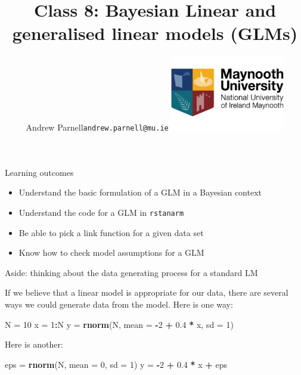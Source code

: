 \documentclass[ignorenonframetext,]{beamer}
\title{Class 8: Bayesian Linear and generalised linear models (GLMs)}
\author{Andrew Parnell\newline \texttt{andrew.parnell@mu.ie}
\newline \vspace{1cm} \newline \includegraphics[width=5cm]{MU_logo.jpg}}
\date{}
\newenvironment{Shaded}{\begin{snugshade}}{\end{snugshade}}
\newcommand{\KeywordTok}[1]{\textcolor[rgb]{0.13,0.29,0.53}{\textbf{#1}}}
\newcommand{\DataTypeTok}[1]{\textcolor[rgb]{0.13,0.29,0.53}{#1}}
\newcommand{\DecValTok}[1]{\textcolor[rgb]{0.00,0.00,0.81}{#1}}
\newcommand{\FloatTok}[1]{\textcolor[rgb]{0.00,0.00,0.81}{#1}}
\newcommand{\StringTok}[1]{\textcolor[rgb]{0.31,0.60,0.02}{#1}}
\newcommand{\OperatorTok}[1]{\textcolor[rgb]{0.81,0.36,0.00}{\textbf{#1}}}
\newcommand{\NormalTok}[1]{#1}
\providecommand{\tightlist}{%
  \setlength{\itemsep}{0pt}\setlength{\parskip}{0pt}}
\begin{document}
\frame{\titlepage}

\begin{frame}[fragile]{Learning outcomes}

\begin{itemize}
\tightlist
\item
  Understand the basic formulation of a GLM in a Bayesian context
\item
  Understand the code for a GLM in \texttt{rstanarm}
\item
  Be able to pick a link function for a given data set
\item
  Know how to check model assumptions for a GLM
\end{itemize}

\end{frame}

\begin{frame}[fragile]{Aside: thinking about the data generating process
for a standard LM}

If we believe that a linear model is appropriate for our data, there are
several ways we could generate data from the model. Here is one way:

\begin{Shaded}
\begin{Highlighting}[]
\NormalTok{N =}\StringTok{ }\DecValTok{10}
\NormalTok{x =}\StringTok{ }\DecValTok{1}\OperatorTok{:}\NormalTok{N}
\NormalTok{y =}\StringTok{ }\KeywordTok{rnorm}\NormalTok{(N, }\DataTypeTok{mean =} \OperatorTok{-}\DecValTok{2} \OperatorTok{+}\StringTok{ }\FloatTok{0.4} \OperatorTok{*}\StringTok{ }\NormalTok{x, }\DataTypeTok{sd =} \DecValTok{1}\NormalTok{)}
\end{Highlighting}
\end{Shaded}

Here is another:

\begin{Shaded}
\begin{Highlighting}[]
\NormalTok{eps =}\StringTok{ }\KeywordTok{rnorm}\NormalTok{(N, }\DataTypeTok{mean =} \DecValTok{0}\NormalTok{, }\DataTypeTok{sd =} \DecValTok{1}\NormalTok{)}
\NormalTok{y =}\StringTok{ }\OperatorTok{-}\DecValTok{2} \OperatorTok{+}\StringTok{ }\FloatTok{0.4} \OperatorTok{*}\StringTok{ }\NormalTok{x }\OperatorTok{+}\StringTok{ }\NormalTok{eps}
\end{Highlighting}
\end{Shaded}

\end{frame}
\end{document}
